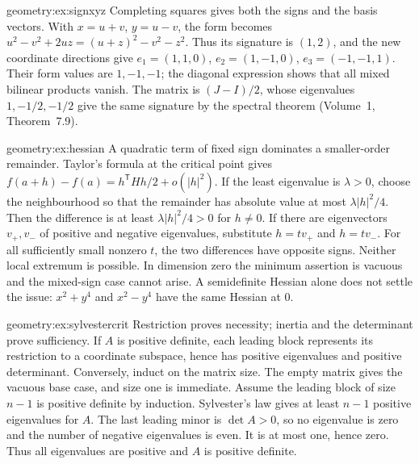 \begin{solution}{geometry:ex:signxyz}
\idea Completing squares gives both the signs and the basis vectors.
\writeup With $x=u+v$, $y=u-v$, the form becomes
$u^2-v^2+2uz=(u+z)^2-v^2-z^2$.
Thus its signature is $(1,2)$, and the new coordinate directions give
$e_1=(1,1,0)$, $e_2=(1,-1,0)$, $e_3=(-1,-1,1)$.
Their form values are $1,-1,-1$; the diagonal expression shows that all
mixed bilinear products vanish. The matrix is $(J-I)/2$, whose eigenvalues
$1,-1/2,-1/2$ give the same signature by the spectral theorem
(Volume~1, Theorem~7.9).
\end{solution}
\begin{solution}{geometry:ex:hessian}
\idea A quadratic term of fixed sign dominates a smaller-order remainder.
\writeup Taylor's formula at the critical point gives
$f(a+h)-f(a)=h^{\mathsf T}Hh/2+o(|h|^2)$.
If the least eigenvalue is $\lambda>0$, choose the neighbourhood so that
the remainder has absolute value at most $\lambda|h|^2/4$.
Then the difference is at least $\lambda|h|^2/4>0$ for $h\ne0$.
If there are eigenvectors $v_+,v_-$ of positive and negative eigenvalues,
substitute $h=tv_+$ and $h=tv_-$. For all sufficiently small nonzero $t$,
the two differences have opposite signs. Neither local extremum is possible.
In dimension zero the minimum assertion is vacuous and the mixed-sign
case cannot arise. A semidefinite Hessian alone does not settle the issue:
$x^2+y^4$ and $x^2-y^4$ have the same Hessian at $0$.
\end{solution}
\begin{solution}{geometry:ex:sylvestercrit}
\idea Restriction proves necessity; inertia and the determinant prove sufficiency.
\writeup If $A$ is positive definite, each leading block represents its
restriction to a coordinate subspace, hence has positive eigenvalues and
positive determinant. Conversely, induct on the matrix size.
The empty matrix gives the vacuous base case, and size one is immediate.
Assume the leading block of size $n-1$ is positive definite by induction.
Sylvester's law gives at least $n-1$ positive eigenvalues for $A$.
The last leading minor is $\det A>0$, so no eigenvalue is zero and the
number of negative eigenvalues is even. It is at most one, hence zero.
Thus all eigenvalues are positive and $A$ is positive definite.
\end{solution}
